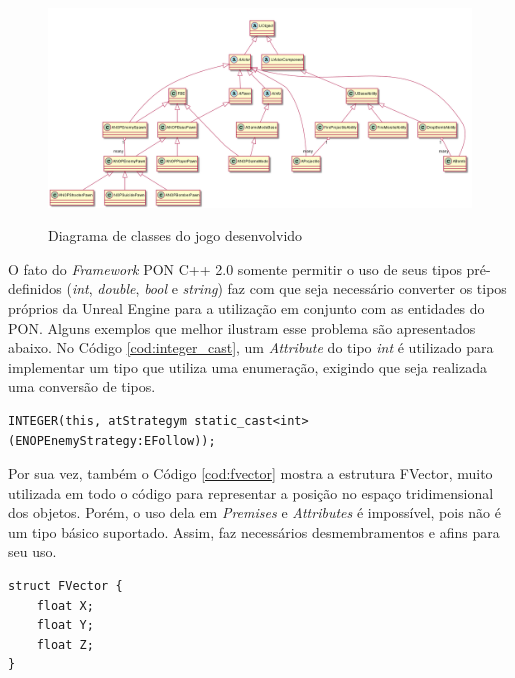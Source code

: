 \begin{figure}[!htb]
  \centering
  \caption{Diagrama de classes do jogo desenvolvido}
  \includegraphics[width=\textwidth]{../out/diagrams/class_diagram_nop/NOPUnreal.png}
  \smallskip
  \label{fig:class_jogo_fw2}
\end{figure}

O fato do \textit{Framework} PON C++ 2.0 somente permitir o uso de seus tipos
pré-definidos (\textit{int}, \textit{double}, \textit{bool} e \textit{string})
faz com que seja necessário converter os tipos próprios da Unreal Engine para a
utilização em conjunto com as entidades do PON. Alguns exemplos que melhor
ilustram esse problema são apresentados abaixo. No Código
\ref{cod:integer_cast}, um \textit{Attribute} do tipo \textit{int} é utilizado
para implementar um tipo que utiliza uma enumeração, exigindo que seja realizada
uma conversão de tipos.

\begin{lstlisting}[caption = {Uso de \textit{static\_cast} para converter enumerações}, float=htb,
source = {Autoria própria},
label = {cod:integer_cast}]
INTEGER(this, atStrategym static_cast<int>(ENOPEnemyStrategy:EFollow));
\end{lstlisting}

Por sua vez, também o Código \ref{cod:fvector} mostra a estrutura FVector, muito
utilizada em todo o código para representar a posição no espaço tridimensional
dos objetos. Porém, o uso dela em \textit{Premises} e \textit{Attributes} é
impossível, pois não é um tipo básico suportado. Assim, faz necessários
desmembramentos e afins para seu uso. 

\begin{lstlisting}[caption = {Estrutura \textit{FVector} da Unreal Engine}, float=htb,
source = {Autoria própria},
label = {cod:fvector}]
struct FVector {
    float X;
    float Y;
    float Z;
}
\end{lstlisting}

